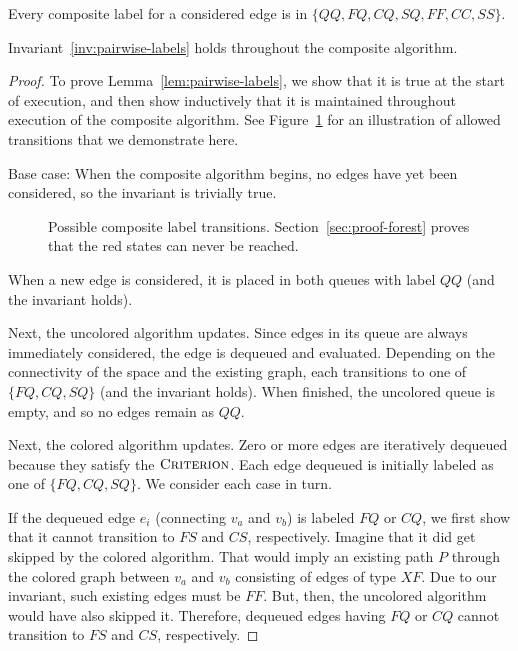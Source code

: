 \vspace{0.05in}

\begin{invariant}
Every composite label for a considered edge is in
$\{ QQ, FQ, CQ, SQ, FF, CC, SS \}$.
\label{inv:pairwise-labels}
\end{invariant}

\vspace{0.05in}

\begin{lemma}
Invariant~\ref{inv:pairwise-labels} holds throughout the composite
algorithm.
\label{lem:pairwise-labels}
\end{lemma}

\begin{proof}
To prove Lemma~\ref{lem:pairwise-labels},
we show that it is true at the start of execution,
and then show inductively that it is maintained throughout execution
of the composite algorithm.
See Figure~\ref{fig:pairwise-labels} for an illustration of allowed
transitions that we demonstrate here.

Base case: When the composite algorithm begins,
no edges have yet been considered,
so the invariant is trivially true.

\begin{figure}
\centering

\caption{Possible composite label transitions.
   Section~\ref{sec:proof-forest} proves that the red states
   can never be reached.}
\label{fig:pairwise-labels}
\end{figure}

When a new edge is considered,
it is placed in both queues with label $QQ$
(and the invariant holds).

Next, the uncolored algorithm updates.
Since edges in its queue are always immediately considered,
the edge is dequeued and evaluated.
Depending on the connectivity of the space and the existing graph,
each transitions to one of $\{ FQ, CQ, SQ \}$ (and the invariant holds).
When finished, the uncolored queue is empty,
and so no edges remain as $QQ$.

Next, the colored algorithm updates.
Zero or more edges are iteratively dequeued
because they satisfy the $\textsc{Criterion}$.
Each edge dequeued is initially labeled as one of $\{ FQ, CQ, SQ \}$.
We consider each case in turn.

If the dequeued edge $e_i$ (connecting $v_a$ and $v_b$)
is labeled $FQ$ or $CQ$,
we first show that it cannot transition to $FS$ and $CS$, respectively.
Imagine that it did get skipped by the colored algorithm.
That would imply an existing path $P$ through the colored graph
between $v_a$ and $v_b$ consisting of edges of type $XF$.
Due to our invariant, such existing edges must be $FF$.
But, then, the uncolored algorithm would have also skipped it.
Therefore, dequeued edges having $FQ$ or $CQ$ cannot transition to
$FS$ and $CS$, respectively.


\end{proof}
